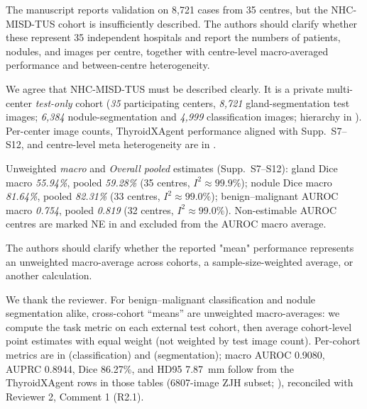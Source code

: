\begin{reviewercomment}
The manuscript reports validation on 8,721 cases from 35 centres, but the NHC-MISD-TUS cohort is insufficiently described. The authors should clarify whether these represent 35 independent hospitals and report the numbers of patients, nodules, and images per centre, together with centre-level macro-averaged performance and between-centre heterogeneity.
\end{reviewercomment}
\begin{authorresponse}
We agree that NHC-MISD-TUS must be described clearly. It is a private multi-center \emph{test-only} cohort (\emph{35} participating centers, \emph{8{,}721} gland-segmentation test images; \emph{6{,}384} nodule-segmentation and \emph{4{,}999} classification images; hierarchy in ). Per-center image counts, ThyroidXAgent performance aligned with Supp.\ S7--S12, and centre-level meta heterogeneity are in .\par
Unweighted \emph{macro} and \emph{Overall pooled} estimates (Supp.\ S7--S12): gland Dice macro \emph{55.94\%}, pooled \emph{59.28\%} (35 centres, $I^2{\approx}99.9\%$); nodule Dice macro \emph{81.64\%}, pooled \emph{82.31\%} (33 centres, $I^2{\approx}99.0\%$); benign--malignant AUROC macro \emph{0.754}, pooled \emph{0.819} (32 centres, $I^2{\approx}99.0\%$). Non-estimable AUROC centres are marked NE in  and excluded from the AUROC macro average.\par
\par
\end{authorresponse}

\begin{reviewercomment}
The authors should clarify whether the reported "mean" performance represents an unweighted macro-average across cohorts, a sample-size-weighted average, or another calculation.
\end{reviewercomment}
\begin{authorresponse}
We thank the reviewer. For benign--malignant classification and nodule segmentation alike, cross-cohort ``means'' are unweighted macro-averages: we compute the task metric on each external test cohort, then average cohort-level point estimates with equal weight (not weighted by test image count). Per-cohort metrics are in  (classification) and  (segmentation); macro AUROC 0.9080, AUPRC 0.8944, Dice 86.27\%, and HD95 7.87~mm follow from the ThyroidXAgent rows in those tables (6807-image ZJH subset; ), reconciled with Reviewer 2, Comment 1 (R2.1).\par
\par
\end{authorresponse}

